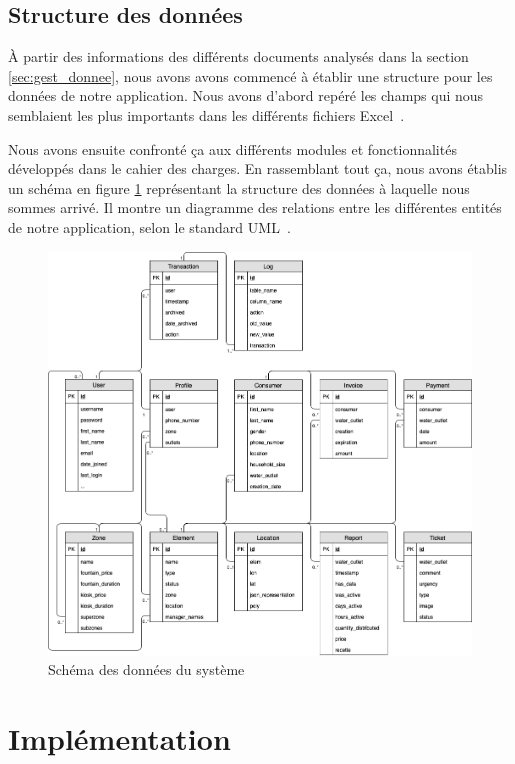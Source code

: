 \documentclass{EPL-master-thesis-covers-FR}
\begin{document}
		\section{Structure des données}

			À partir des informations des différents documents analysés dans la section \ref{sec:gest_donnee}, nous avons avons commencé à établir une structure pour les données de notre application. Nous avons d'abord repéré les champs qui nous semblaient les plus importants dans les différents fichiers Excel~\cite{ref:resumes_documents}.

			Nous avons ensuite confronté ça aux différents modules et fonctionnalités développés dans le cahier des charges. En rassemblant tout ça, nous avons établis un schéma en figure \ref{fig:db} représentant la structure des données à laquelle nous sommes arrivé. Il montre un diagramme des relations entre les différentes entités de notre application, selon le standard UML~\cite{ref:siegfried_db}.

			\begin{figure}
				\centering
				\includegraphics[width=\textwidth]{images/db}
				\caption{Schéma des données du système}
				\label{fig:db}
			\end{figure}

	\chapter{Implémentation}
\end{document}
